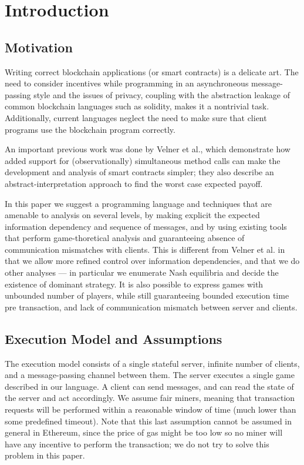 \documentclass[acmsmall,review,anonymous]{acmart}\settopmatter{printfolios=true,printccs=false,printacmref=false}
\begin{document}
\section{Introduction}

\subsection{Motivation}
Writing correct blockchain applications (or smart contracts) is a delicate art. The need to consider incentives while programming in an asynchroneous message-passing style and the issues of privacy, coupling with the abstraction leakage of common blockchain languages such as solidity, makes it a nontrivial task. Additionally, current languages neglect the need to make sure that client programs use the blockchain program correctly.

An important previous work was done by Velner et al., which demonstrate how added support for (observationally) simultaneous method calls can make the development and analysis of smart contracts simpler; they also describe an abstract-interpretation approach to find the worst case expected payoff.

In this paper we suggest a programming language and techniques that are amenable to analysis on several levels, by making explicit the expected information dependency and sequence of messages, and by using existing tools that perform game-thoretical analysis and guaranteeing absence of communication mismatches with clients. This is different from Velner et al. in that we allow more refined control over information dependencies, and that we do other analyses --- in particular we enumerate Nash equilibria and decide the existence of dominant strategy. It is also possible to express games with unbounded number of players, while still guaranteeing bounded execution time pre transaction, and lack of communication mismatch between server and clients.

\subsection{Execution Model and Assumptions}
The execution model consists of a single stateful server, infinite number of clients, and a message-passing channel between them. The server executes a single game described in our language. A client can send messages, and can read the state of the server and act accordingly. We assume fair miners, meaning that transaction requests will be performed within a reasonable window of time (much lower than some predefined timeout). Note that this last assumption cannot be assumed in general in Ethereum, since the price of gas might be too low so no miner will have any incentive to perform the transaction; we do not try to solve this problem in this paper.
\end{document}
